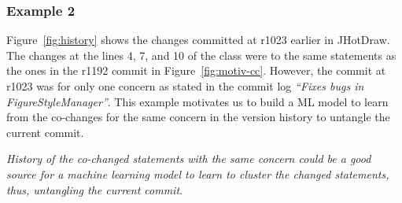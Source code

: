 \subsubsection{Example 2}

Figure~\ref{fig:history} shows the changes committed at r1023 earlier
in JHotDraw. The changes at the lines 4, 7, and 10 of the
 class were to the same statements as the ones in the
r1192 commit in Figure~\ref{fig:motiv-cc}. However, the commit at
r1023 was for only one concern as stated in the commit log {\em
  ``Fixes bugs in FigureStyleManager''}. This example motivates us to
build a ML model to learn from the co-changes for the same concern in
the version history to untangle the current commit.


\vspace{3pt}
 {\em
  History of the co-changed statements with the same concern could be
  a good source for a machine learning model to learn to cluster the
  changed statements, thus, untangling the current commit}.
